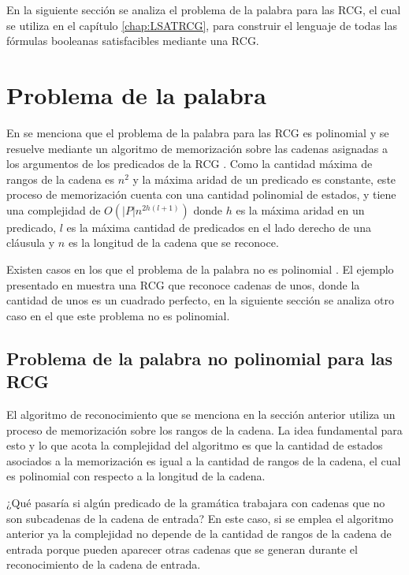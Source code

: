 En la siguiente sección se analiza el problema de la palabra para las RCG, el cual se utiliza en el
capítulo \ref{chap:LSATRCG}, para construir el lenguaje de todas las fórmulas booleanas satisfacibles mediante
una RCG.

\section{Problema de la palabra}

En \cite{mainRCGBib} se menciona que el problema de la palabra para las RCG es polinomial y 
se resuelve mediante un algoritmo de memorización sobre las cadenas asignadas a los argumentos 
de los predicados de la RCG \cite{mainRCGBib}.  Como la cantidad máxima de rangos de la cadena es 
$n^2$ y la máxima aridad de un predicado es constante, 
este proceso de memorización cuenta con una cantidad polinomial de estados, y 
tiene una complejidad de $O(|P|n^{2h(l+1)})$ donde $h$ es la máxima aridad en un predicado, $l$ es 
la máxima cantidad de predicados en el lado derecho de una cláusula y $n$ es la longitud de la cadena que se reconoce.

Existen casos en los que el problema de la palabra no es polinomial \cite{propertiesRCGBib}.  El ejemplo presentado en \cite{propertiesRCGBib} muestra una RCG que reconoce cadenas de unos, donde la cantidad de unos es un cuadrado perfecto, en la siguiente sección se analiza otro caso en el que este problema no es polinomial.

\subsection{Problema de la palabra no polinomial para las RCG}

El algoritmo de reconocimiento que se menciona en la sección anterior utiliza un proceso de memorización sobre los rangos de la cadena.  La idea fundamental para esto y lo que acota la complejidad del algoritmo es que la cantidad de estados asociados a la memorización es igual a la cantidad de rangos de la cadena, el cual es polinomial con respecto a la longitud de la cadena.

¿Qué pasaría si algún predicado de la gramática trabajara con cadenas que no son subcadenas de la cadena de entrada? 
En este caso, si se emplea el algoritmo anterior ya la complejidad no depende de la cantidad de rangos de la cadena de entrada 
porque pueden aparecer otras cadenas que se generan durante el reconocimiento de la cadena de entrada.

